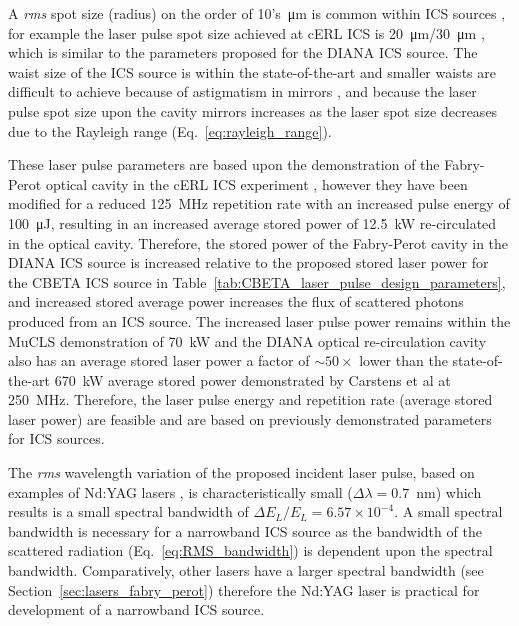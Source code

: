 \documentclass[../main.tex]{subfiles}
\begin{document}
A \textit{rms} spot size (radius) on the order of 10's~\si{\micro\meter} is common within ICS sources \cite{deitrick2017inverse,drebot2019brixs,dupraz2020thomx}, for example the laser pulse spot size achieved at cERL ICS is 20~\si{\micro\meter}/30~\si{\micro\meter} \cite{akagi2016narrow}, which is similar to the parameters proposed for the DIANA ICS source. The waist size of the ICS source is within the state-of-the-art and smaller waists are difficult to achieve because of astigmatism in mirrors \cite{zomer2009polarization}, and because the laser pulse spot size upon the cavity mirrors increases as the laser spot size decreases due to the Rayleigh range (Eq.~\ref{eq:rayleigh_range}).

These laser pulse parameters are based upon the demonstration of the Fabry-Perot optical cavity in the cERL ICS experiment \cite{akagi2016narrow}, however they have been modified for a reduced 125~\si{\mega\hertz} repetition rate with an increased pulse energy of 100~\si{\micro\joule}, resulting in an increased average stored power of 12.5~\si{\kilo\watt} re-circulated in the optical cavity. Therefore, the stored power of the Fabry-Perot cavity in the DIANA ICS source is increased relative to the proposed  stored laser power for the CBETA ICS source in Table~\ref{tab:CBETA_laser_pulse_design_parameters}, and increased stored average power increases the flux of scattered photons produced from an ICS source. The increased laser pulse power remains within the MuCLS demonstration of 70~\si{\kilo\watt} \cite{eggl2016munich} and the DIANA optical re-circulation cavity also has an average stored laser power a factor of $\sim50\times$ lower than the state-of-the-art 670~\si{\kilo\watt} average stored power demonstrated by Carstens et al \cite{carstens2014megawatt} at 250~\si{\mega\hertz}. Therefore, the laser pulse energy and repetition rate (average stored laser power) are feasible and are based on previously demonstrated parameters for ICS sources. 

The \textit{rms} wavelength variation of the proposed incident laser pulse, based on examples of Nd:YAG lasers \cite{thorlabs2021ndyag200}, is characteristically small ($\Delta\lambda = 0.7$~\si{\nano\meter}) \cite{corner2019} which results is a small spectral bandwidth of $\Delta E_{L}/E_{L} = 6.57\times 10^{-4}$. A small spectral bandwidth is necessary for a narrowband ICS source as the bandwidth of the scattered radiation (Eq.~\ref{eq:RMS_bandwidth}) is dependent upon the spectral bandwidth. Comparatively, other lasers have a larger spectral bandwidth (see Section~\ref{sec:lasers_fabry_perot}) therefore the Nd:YAG laser is practical for development of a narrowband ICS source. 
\end{document}
